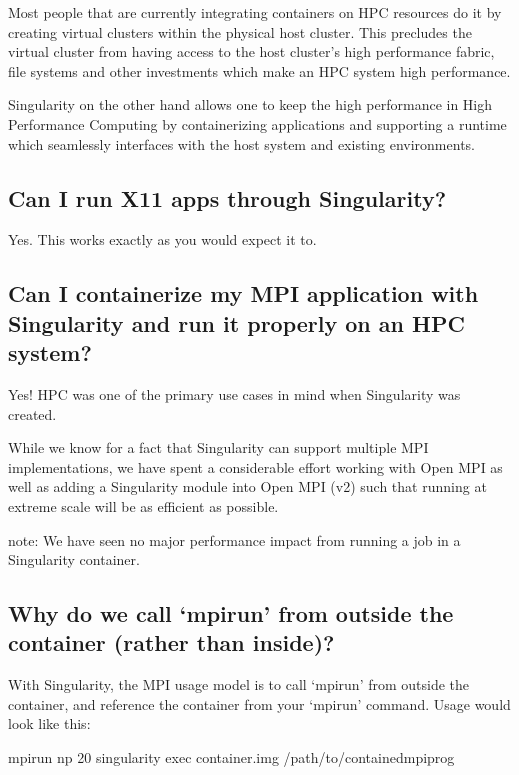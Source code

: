 \documentclass[letterpaper,10pt,english]{sphinxmanual}
\begin{document}
Most people that are currently integrating containers on HPC resources do it by creating virtual clusters within the physical host cluster.
This precludes the virtual cluster from having access to the host cluster’s high performance fabric, file systems and other investments which make an HPC system high performance.

Singularity on the other hand allows one to keep the high performance in High Performance Computing by containerizing applications and supporting
a runtime which seamlessly interfaces with the host system and existing environments.


\subsection{Can I run X11 apps through Singularity?}
\label{\detokenize{faq:can-i-run-x11-apps-through-singularity}}
Yes. This works exactly as you would expect it to.


\subsection{Can I containerize my MPI application with Singularity and run it properly on an HPC system?}
\label{\detokenize{faq:can-i-containerize-my-mpi-application-with-singularity-and-run-it-properly-on-an-hpc-system}}
Yes! HPC was one of the primary use cases in mind when Singularity was created.

While we know for a fact that Singularity can support multiple MPI implementations, we have spent a considerable effort working with Open MPI
as well as adding a Singularity module into Open MPI (v2) such that running at extreme scale will be as efficient as possible.

note: We have seen no major performance impact from running a job in a Singularity container.


\subsection{Why do we call ‘mpirun’ from outside the container (rather than inside)?}
\label{\detokenize{faq:why-do-we-call-mpirun-from-outside-the-container-rather-than-inside}}
With Singularity, the MPI usage model is to call ‘mpirun’ from outside the container, and reference the container from your ‘mpirun’ command. Usage would look like this:

%
\begin{sphinxVerbatim}[commandchars=\\\{\}]
\PYGZdl{} mpirun \PYGZhy{}np 20 singularity exec container.img /path/to/contained\PYGZus{}mpi\PYGZus{}prog
\end{sphinxVerbatim}
\end{document}
